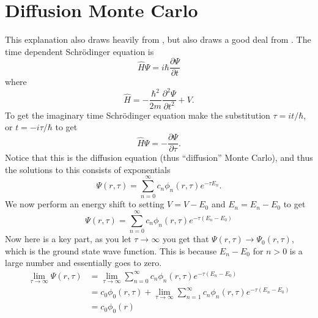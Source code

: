 \section*{Diffusion Monte Carlo}
This explanation also draws heavily from \cite{foulkes2001}, but also draws a good deal from \cite{kosztin1996}. The time dependent Schr\"odinger equation is
\begin{equation}
  \hat H \Psi = i \hbar \frac{\partial \Psi}{\partial t}
\end{equation}
where
\begin{equation}
  \hat H = -\frac{\hbar^2}{2m}\frac{\partial^2\Psi}{\partial t^2} + V.
\end{equation}
To get the imaginary time Schr\"odinger equation make the substitution $\tau=i t/\hbar$, or $t=-i \tau / \hbar$ to get
\begin{equation}
  \hat H \Psi = - \frac{\partial \Psi}{\partial \tau}.
\end{equation}
Notice that this is the diffusion equation (thus ``diffusion'' Monte Carlo), and thus the solutions to this consists of exponentials
\begin{equation}
  \Psi(r,\tau) = \sum\limits_{n=0}^\infty c_n \phi_n(r,\tau) e^{- \tau E_n}.
\end{equation}
We now perform an energy shift to setting $V=V-E_0$ and $E_n=E_n-E_0$ to get
\begin{equation}
  \Psi(r,\tau) = \sum\limits_{n=0}^\infty c_n \phi_n(r,\tau) e^{- \tau (E_n-E_0)}
\end{equation}
Now here is a key part, as you let $\tau \rightarrow \infty$ you get that $\Psi(r,\tau) \rightarrow \Psi_0(r,\tau)$, which is the ground state wave function. This is because $E_n-E_0$ for $n>0$ is a large number and essentially goes to zero.
\begin{equation}
  \begin{split}
    \lim_{\tau \to \infty} \Psi(r,\tau) &= \lim_{\tau \to \infty} \sum\limits_{n=0}^\infty c_n \phi_n(r,\tau) e^{- \tau (E_n-E_0)} \\
    &= c_0 \phi_0(r,\tau) + \lim_{\tau \to \infty} \sum\limits_{n=1}^\infty c_n \phi_n(r,\tau) e^{- \tau (E_n-E_0)} \\
    &= c_0 \phi_0(r)
  \end{split}
\end{equation}

